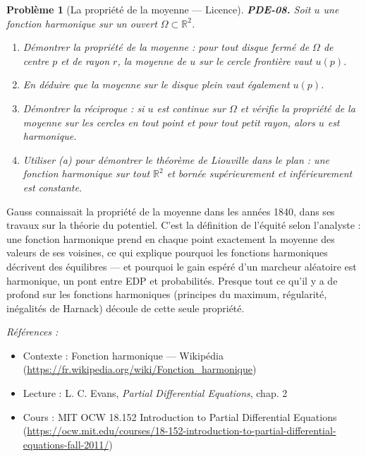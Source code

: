 \documentclass[11pt]{article}
\newtheorem{problem}{Problème}
\newenvironment{refs}{\par\small\noindent\emph{Références :}\begin{itemize}\setlength\itemsep{0pt}}{\end{itemize}\normalsize}
\begin{document}
\bigskip

\begin{problem}[{La propriété de la moyenne --- Licence}]
\textbf{PDE-08.} Soit $u$ une fonction harmonique sur un ouvert
$\Omega \subset \mathbb{R}^2$.
\begin{enumerate}
\item[(a)] Démontrer la propriété de la moyenne : pour tout disque
fermé de $\Omega$ de centre $p$ et de rayon $r$, la moyenne de $u$ sur le
cercle frontière vaut $u(p)$.
\item[(b)] En déduire que la moyenne sur le disque plein
vaut également $u(p)$.
\item[(c)] Démontrer la réciproque : si $u$ est continue sur $\Omega$
et vérifie la propriété de la moyenne sur les cercles en tout point et pour tout petit rayon,
alors $u$ est harmonique.
\item[(d)] Utiliser (a) pour démontrer le théorème de Liouville dans le plan : une
fonction harmonique sur tout $\mathbb{R}^2$ et bornée supérieurement et inférieurement est
constante.
\end{enumerate}

\end{problem}

\noindent Gauss connaissait la propriété de la moyenne dans les années 1840, dans ses
travaux sur la théorie du potentiel. C'est la définition de l'équité selon l'analyste : une
fonction harmonique prend en chaque point exactement la moyenne des valeurs de ses voisines, ce
qui explique pourquoi les fonctions harmoniques décrivent des équilibres --- et pourquoi le gain
espéré d'un marcheur aléatoire est harmonique, un pont entre EDP et probabilités. Presque tout ce
qu'il y a de profond sur les fonctions harmoniques (principes du maximum, régularité, inégalités
de Harnack) découle de cette seule propriété.

\begin{refs}
\item Contexte : Fonction harmonique --- Wikipédia (\url{https://fr.wikipedia.org/wiki/Fonction_harmonique})
\item Lecture : L. C. Evans, \textit{Partial Differential Equations}, chap. 2
\item Cours : MIT OCW 18.152 Introduction to Partial Differential Equations (\url{https://ocw.mit.edu/courses/18-152-introduction-to-partial-differential-equations-fall-2011/})
\end{refs}

\bigskip
\end{document}
